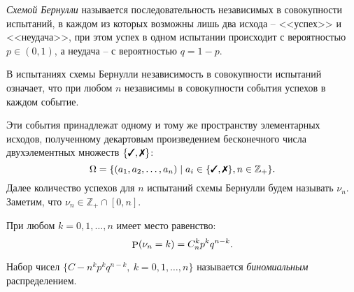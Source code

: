 \begin{to_def}
    \textit{Схемой Бернулли} называется последовательность независимых в совокупности испытаний, в каждом из 
    которых возможны лишь два исхода -- <<успех>> и <<неудача>>, при этом успех \cmark в одном испытании происходит с вероятностью $p \in (0, 1)$, а неудача \xmark -- с вероятностью $q = 1 - p$.
\end{to_def}

В испытаниях схемы Бернулли  независимость в совокупности испытаний означает, что при любом $n$ независимы в совокупности события успехов в каждом событие. 

Эти события принадлежат одному и тому же пространству элементарных исходов, полученному декартовым произведением бесконечного числа двухэлементных множеств $\{\cmark, \xmark\}$:
\begin{equation*}
    \Omega = \{(a_1, a_2, \ldots, a_n) \mid a_i \in \{\cmark, \xmark\}, n \in \mathbb{Z}_+\}.
\end{equation*}
Далее количество успехов для $n$ испытаний схемы Бернулли будем называть $\nu_n$. Заметим, что $\nu_n \in \mathbb{Z}_+ \cap [0, n]$. 

\begin{to_thr}
    При любом $k = 0, 1, \ldots, n$ имеет место равенство:
    \begin{equation*}
        \P (\nu_n = k) = C_n^k p^k q^{n-k}.
    \end{equation*}
\end{to_thr}

\begin{to_def}[$\mathfrak D$]
    Набор чисел $\{C-n^k p^k q^{n-k}, \ k = 0, 1, \ldots, n\}$ называется \textit{биномиальным} распределением.
\end{to_def}

